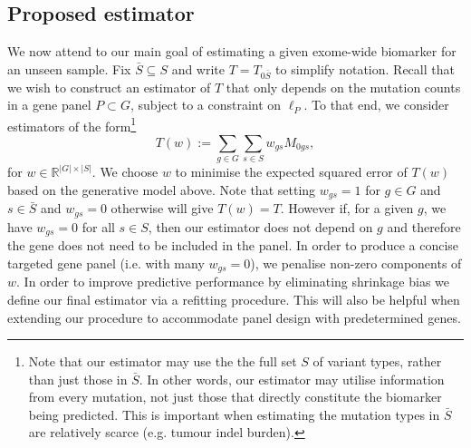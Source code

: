 \documentclass[10pt,twoside,openright]{report}
\begin{document}
\subsection{Proposed estimator \label{sec:linearestimator}}
We now attend to our main goal of estimating a given exome-wide biomarker for an unseen sample. Fix $\bar{S} \subseteq S$ and write $T = T_{0\bar{S}}$ to simplify notation. Recall that we wish to construct an estimator of $T$ that only depends on the mutation counts in a gene panel $P \subset G$, subject to a constraint on $\ell_P$. To that end, we consider estimators of the form\footnote{Note that our estimator may use the the full set $S$ of variant types, rather than just those in $\bar{S}$. In other words, our estimator may utilise information from every mutation, not just those that directly constitute the biomarker being predicted. This is important when estimating the mutation types in $\bar{S}$ are relatively scarce (e.g. tumour indel burden).}
\[
T(w) := \sum_{g \in G} \sum_{s \in S} w_{gs}M_{0gs},
\]
for $w \in \mathbb{R}^{|G|\times |S|}$. We choose $w$ to minimise the expected squared error of $T(w)$ based on the generative model above. Note that setting $w_{gs}= 1$ for $g \in G$ and $s \in \bar{S}$ and $w_{gs} = 0$ otherwise will give $T(w) = T$. 
However if, for a given $g$, we have $w_{gs} = 0$ for all $s \in S$, then our estimator does not depend on $g$ and therefore the gene does not need to be included in the panel. In order to produce a concise targeted gene panel (i.e. with many $w_{gs} = 0$), we penalise non-zero components of $w$. In order to improve predictive performance by eliminating shrinkage bias we define our final estimator via a refitting procedure. This will also be helpful when extending our procedure to accommodate panel design with predetermined genes.
\end{document}

